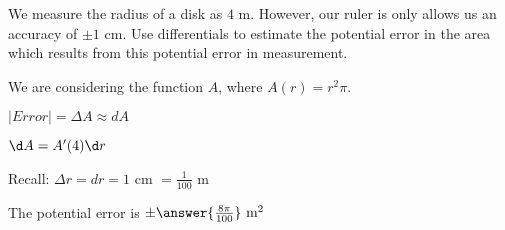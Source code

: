 \documentclass{ximera}
\author{Steven Gubkin}
\begin{document}
\begin{exercise}
  We measure the radius of a disk as $4 \textrm{ m}$.  However, our
  ruler is only allows us an accuracy of $\pm 1 \textrm{ cm}$.  Use
  differentials to estimate the potential error in the area which
  results from this potential error in measurement.
\begin{hint}
We are considering the function $A$, where $A(r)=r^2\pi$.
\end{hint}
\begin{hint}
 $|Error| =\Delta A\approx dA$
\begin{image}
  \end{image}
\end{hint}
\begin{hint}
$\d A=A'(4)\d r$

Recall: $\Delta r=dr=1$ cm $= \frac{1}{100}$ m
\end{hint}
\begin{prompt}
  The potential error is $\pm \answer{\frac{8\pi}{100}} \textrm{ m}^2$
\end{prompt}

\end{exercise}
\end{document}
